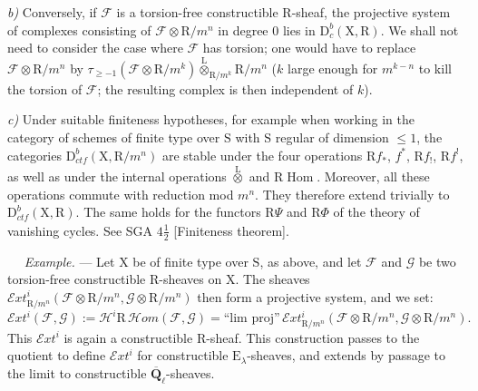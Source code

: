 \documentclass[11pt,leqno]{article}
\newcommand{\Page}[1]{\ifvmode\noindent\else\unskip\ \fi{\footnotesize\textcolor{gray}{[p.\,#1]}}\ \ignorespaces}
\begin{document}
\textit{b)} Conversely, if \(\mathscr{F}\) is a torsion-free constructible \(\mathrm{R}\)-sheaf, the projective system of complexes consisting of \(\mathscr{F}\otimes\mathrm{R}/m^n\) in degree 0 lies in \(\mathrm{D}_c^b(\mathrm{X},\mathrm{R})\). We shall not need to consider the case where \(\mathscr{F}\) has torsion; one would have to replace \(\mathscr{F}\otimes\mathrm{R}/m^n\) by \(\tau_{\geq-1}(\mathscr{F}\otimes\mathrm{R}/m^k)\overset{\mathrm{L}}{\otimes}_{\mathrm{R}/m^k}\mathrm{R}/m^n\) (\(k\) large enough for \(m^{k-n}\) to kill the torsion of \(\mathscr{F}\); the resulting complex is then independent of \(k\)).

\textit{c)} Under suitable finiteness hypotheses, for example when working in the category of schemes of finite type over \(\mathrm{S}\) with \(\mathrm{S}\) regular of dimension \(\leq1\), the categories \(\mathrm{D}_{\mathit{ctf}}^b(\mathrm{X},\mathrm{R}/m^n)\) are stable under the four operations \(\mathrm{R}f_*\), \(f^*\), \(\mathrm{R}f_!\), \(\mathrm{R}f^!\), as well as under the internal operations \(\overset{\mathrm{L}}{\otimes}\) and \(\mathrm{R}\operatorname{Hom}\). Moreover, all these operations commute with reduction mod \(m^n\). They therefore extend trivially to \(\mathrm{D}_{\mathit{ctf}}^b(\mathrm{X},\mathrm{R})\). The same holds for the functors \(\mathrm{R}\Psi\) and \(\mathrm{R}\Phi\) of the theory of vanishing cycles. See SGA \(4\frac{1}{2}\) [Finiteness theorem].

\Page{149}
\textit{Example.} — Let \(\mathrm{X}\) be of finite type over \(\mathrm{S}\), as above, and let \(\mathscr{F}\) and \(\mathscr{G}\) be two torsion-free constructible \(\mathrm{R}\)-sheaves on \(\mathrm{X}\). The sheaves \(\mathscr{E}xt^i_{\mathrm{R}/m^n}(\mathscr{F}\otimes\mathrm{R}/m^n,\mathscr{G}\otimes\mathrm{R}/m^n)\) then form a projective system, and we set:
\[
\mathscr{E}xt^i(\mathscr{F},\mathscr{G})
:=\mathscr{H}^i\mathrm{R}\,\mathscr{H}om(\mathscr{F},\mathscr{G})
=\text{“lim proj”}\,\mathscr{E}xt^i_{\mathrm{R}/m^n}
(\mathscr{F}\otimes\mathrm{R}/m^n,\mathscr{G}\otimes\mathrm{R}/m^n).
\]
This \(\mathscr{E}xt^i\) is again a constructible \(\mathrm{R}\)-sheaf. This construction passes to the quotient to define \(\mathscr{E}xt^i\) for constructible \(\mathrm{E}_\lambda\)-sheaves, and extends by passage to the limit to constructible \(\overline{\mathbf{Q}}_\ell\)-sheaves.
\end{document}
